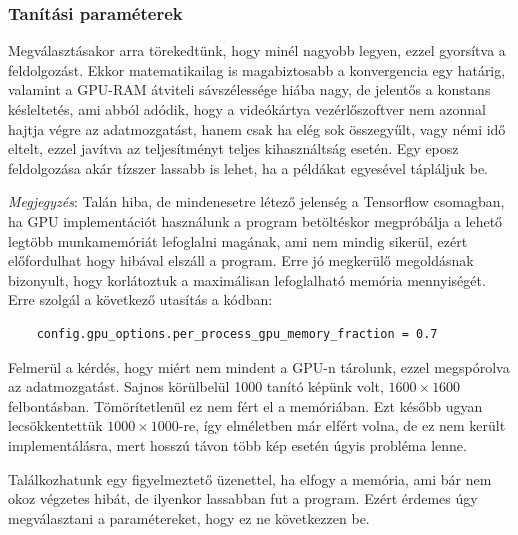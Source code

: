 \subsubsection{Tanítási paraméterek}



\nopagebreak

Megválasztásakor arra törekedtünk, hogy minél nagyobb legyen, ezzel gyorsítva a feldolgozást.
Ekkor matematikailag is magabiztosabb a konvergencia egy határig, 
valamint a GPU-RAM átviteli sávszélessége hiába nagy, de jelentős a konstans késleltetés, 
ami abból adódik, hogy a videókártya vezérlőszoftver nem azonnal hajtja végre az adatmozgatást,
hanem csak ha elég sok összegyűlt, vagy némi idő eltelt, ezzel javítva az teljesítményt teljes 
kihasználtság esetén. Egy eposz feldolgozása akár tízszer lassabb is lehet, ha a példákat
egyesével tápláljuk be.



\label{gpu.memory}
\textit{Megjegyzés}: Talán hiba, de mindenesetre létező jelenség a Tensorflow csomagban, ha GPU implementációt használunk a program betöltéskor megpróbálja a lehető legtöbb 
munkamemóriát lefoglalni magának, ami nem mindig sikerül, 
ezért előfordulhat hogy hibával elszáll a program. Erre jó megkerülő megoldásnak bizonyult, hogy
korlátoztuk a maximálisan lefoglalható memória mennyiségét. Erre szolgál a következő utasítás a kódban:
\begin{lstlisting}
	config.gpu_options.per_process_gpu_memory_fraction = 0.7
\end{lstlisting}


Felmerül a kérdés, hogy miért nem mindent a GPU-n tárolunk, ezzel megspórolva az adatmozgatást.
Sajnos körülbelül 1000 tanító képünk volt, $ 1600 \times 1600 $ felbontásban. 
Tömörítetlenül ez nem fért el a memóriában. Ezt később ugyan lecsökkentettük
$ 1000 \times 1000 $-re, így elméletben már elfért volna, de ez nem került implementálásra,
mert hosszú távon több kép esetén úgyis probléma lenne.



Találkozhatunk egy figyelmeztető üzenettel, ha elfogy a memória, ami bár nem 
okoz végzetes hibát, de ilyenkor lassabban fut a program. Ezért érdemes úgy megválasztani
a paramétereket, hogy ez ne következzen be.


